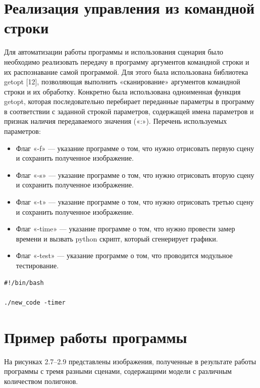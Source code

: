 \documentclass[a4paper,14pt]{extreport}
\begin{document}
\section{Реализация управления из командной строки}
Для автоматизации работы программы и использования сценария было 
необходимо реализовать передачу в программу аргументов командной строки и 
их распознавание самой программой. Для этого была использована библиотека 
getopt [12], позволяющая выполнить «сканирование» аргументов командной 
строки и их обработку. Конкретно была использована одноименная функция 
getopt, которая последовательно перебирает переданные параметры в программу 
в соответствии с заданной строкой параметров, содержащей имена параметров и 
признак наличия передаваемого значения («:»).
Перечень используемых параметров:
\begin{itemize}
\item Флаг «-f» — указание программе о том, что нужно отрисовать первую сцену и сохранить полученное изображение.
\item Флаг «-s» — указание программе о том, что нужно отрисовать вторую сцену и сохранить полученное изображение.
\item Флаг «-t» — указание программе о том, что нужно отрисовать третью сцену и сохранить полученное изображение.
\item Флаг «-time» — указание программе о том, что нужно провести замер времени и вызвать python скрипт, который сгенерирует графики.
\item Флаг «-test» — указание программе о том, что проводится модульное тестирование.
\end{itemize}
\begin{lstlisting}[label=some-code,caption= пример вызова программы для замеров времени ]
#!/bin/bash

./new_code -timer 
\end{lstlisting}
\section{Пример работы программы}
На рисунках 2.7–2.9 представлены изображения, полученные в результате 
работы программы с тремя разными сценами, содержащими модели с 
различным количеством полигонов.
\end{document}

